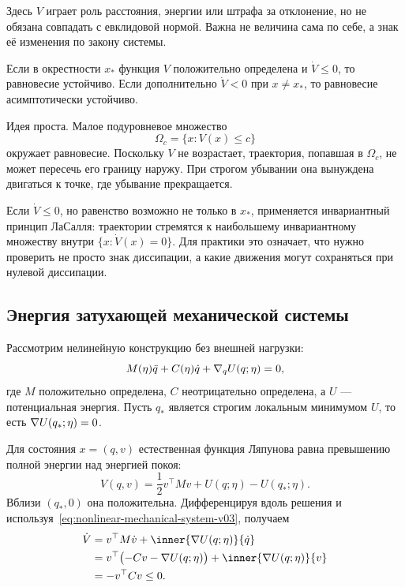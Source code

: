 Здесь $V$ играет роль расстояния, энергии или штрафа за отклонение, но не обязана совпадать с евклидовой нормой. Важна не величина сама по себе, а знак её изменения по закону системы.

\begin{theorem}
\label{thm:direct-lyapunov-v03}
Если в окрестности $x_*$ функция $V$ положительно определена и $\dot V\leq0$, то равновесие устойчиво. Если дополнительно $\dot V<0$ при $x\neq x_*$, то равновесие асимптотически устойчиво.
\end{theorem}

Идея проста. Малое подуровневое множество
\[
\Omega_c
=
\{x:V(x)\leq c\}
\]
окружает равновесие. Поскольку $V$ не возрастает, траектория, попавшая в $\Omega_c$, не может пересечь его границу наружу. При строгом убывании она вынуждена двигаться к точке, где убывание прекращается.

Если $\dot V\leq0$, но равенство возможно не только в $x_*$, применяется инвариантный принцип ЛаСалля: траектории стремятся к наибольшему инвариантному множеству внутри $\{x:\dot V(x)=0\}$. Для практики это означает, что нужно проверить не просто знак диссипации, а какие движения могут сохраняться при нулевой диссипации.

\subsection{Энергия затухающей механической системы}

Рассмотрим нелинейную конструкцию без внешней нагрузки:
\begin{equation}
\label{eq:nonlinear-mechanical-system-v03}
M(\eta)\ddot q
+C(\eta)\dot q
+\nabla_q U(q;\eta)=0,
\end{equation}
где $M$ положительно определена, $C$ неотрицательно определена, а $U$ --- потенциальная энергия. Пусть $q_*$ является строгим локальным минимумом $U$, то есть $\nabla U(q_*;\eta)=0$.

Для состояния $x=(q,v)$ естественная функция Ляпунова равна превышению полной энергии над энергией покоя:
\begin{equation}
\label{eq:mechanical-lyapunov-energy-v03}
V(q,v)
=
\frac12 v^\top Mv
+U(q;\eta)-U(q_*;\eta).
\end{equation}
Вблизи $(q_*,0)$ она положительна. Дифференцируя вдоль решения и используя~\eqref{eq:nonlinear-mechanical-system-v03}, получаем
\begin{align}
\dot V
&=
v^\top M\dot v
+\inner{\grad U(q;\eta)}{\dot q}
\notag\\
&=
v^\top\bigl(-Cv-\grad U(q;\eta)\bigr)
+\inner{\grad U(q;\eta)}{v}
\notag\\
&=
-v^\top Cv
\leq0.
\label{eq:mechanical-energy-dissipation-v03}
\end{align}

